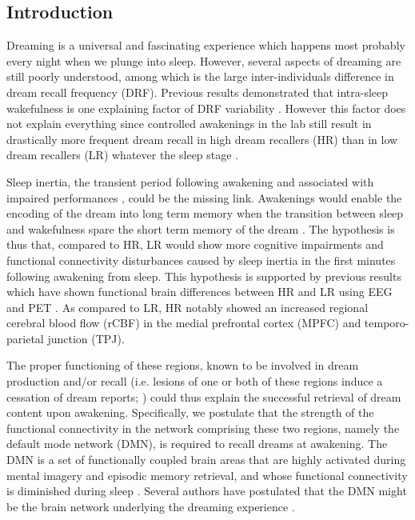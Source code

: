 \subsection*{Introduction}
\label{res:inertia:drf:intro}

Dreaming is a universal and fascinating experience which happens most probably every night when we plunge into sleep. However, several aspects of dreaming are still poorly understood, among which is the large inter-individuals difference in dream recall frequency (DRF). Previous results demonstrated that intra-sleep wakefulness is one explaining factor of DRF variability \citep{eichenlaub_brain_2014, vallat_increased_2017}. However this factor does not explain everything since controlled awakenings in the lab still result in drastically more frequent dream recall in high dream recallers (HR) than in low dream recallers (LR) whatever the sleep stage \citep{goodenough_comparison_1959, eichenlaub_resting_2014, eichenlaub_brain_2014}.

Sleep inertia, the transient period following awakening and associated with impaired performances \citep{tassi_sleep_2000, trotti_waking_2016}, could be the missing link. Awakenings would enable the encoding of the dream into long term memory when the transition between sleep and wakefulness spare the short term memory of the dream \citep{koulack_dream_1976}. The hypothesis is thus that, compared to HR, LR would show more cognitive impairments and functional connectivity disturbances caused by sleep inertia in the first minutes following awakening from sleep. This hypothesis is supported by previous results which have shown functional brain differences between HR and LR using EEG \citep{eichenlaub_brain_2014} and PET \citep{eichenlaub_resting_2014}. As compared to LR, HR notably showed an increased regional cerebral blood flow (rCBF) in the medial prefrontal cortex (MPFC) and temporo-parietal junction (TPJ).

The proper functioning of these regions, known to be involved in dream production and/or recall (i.e. lesions of one or both of these regions induce a cessation of dream reports; \citealp{solms_neuropsychology_1997, solms_dreaming_2000}) could thus explain the successful retrieval of dream content upon awakening. Specifically, we postulate that the strength of the functional connectivity in the network comprising these two regions, namely the default mode network (DMN), is required to recall dreams at awakening. The DMN is a set of functionally coupled brain areas \citep{raichle_default_2001, legrand_what_2009, sestieri_episodic_2011} that are highly activated during mental imagery and episodic memory retrieval, and whose functional connectivity is diminished during sleep \citep{horovitz_decoupling_2009, larson-prior_modulation_2011, samann_development_2011}. Several authors have postulated that the DMN might be the brain network underlying the dreaming experience \citep{domhoff_neural_2011, christoff_mind-wandering_2016}.

